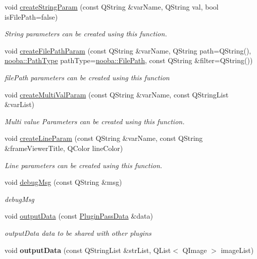 \begin{DoxyCompactItemize}
void \hyperlink{class_nooba_plugin_a_p_i_adeb3d73461908d5bc4b0e2749ec9a74e}{create\-String\-Param} (const Q\-String \&var\-Name, Q\-String val, bool is\-File\-Path=false)
\begin{DoxyCompactList}\small\item\em String parameters can be created using this function. \end{DoxyCompactList}\item 
void \hyperlink{class_nooba_plugin_a_p_i_af2517b4c6e3c48d38cf9dd7667a03186}{create\-File\-Path\-Param} (const Q\-String \&var\-Name, Q\-String path=Q\-String(), \hyperlink{namespacenooba_a63ed48aaaaeaf49835daddab6c63695e}{nooba\-::\-Path\-Type} path\-Type=\hyperlink{namespacenooba_a63ed48aaaaeaf49835daddab6c63695eaf95e834f706cf854b89935b78de070bd}{nooba\-::\-File\-Path}, const Q\-String \&filter=Q\-String())
\begin{DoxyCompactList}\small\item\em file\-Path parameters can be created using this function \end{DoxyCompactList}\item 
void \hyperlink{class_nooba_plugin_a_p_i_a210a3566212cc6ca1e947a8b8bec3818}{create\-Multi\-Val\-Param} (const Q\-String \&var\-Name, const Q\-String\-List \&var\-List)
\begin{DoxyCompactList}\small\item\em Multi value Parameters can be created using this function. \end{DoxyCompactList}\item 
void \hyperlink{class_nooba_plugin_a_p_i_a144f4a7f58fb393cab86d7b90d4a4728}{create\-Line\-Param} (const Q\-String \&var\-Name, const Q\-String \&frame\-Viewer\-Title, Q\-Color line\-Color)
\begin{DoxyCompactList}\small\item\em Line parameters can be created using this function. \end{DoxyCompactList}\item 
void \hyperlink{class_nooba_plugin_a_p_i_a80cde69ffe9b2d2594f7e45783043aed}{debug\-Msg} (const Q\-String \&msg)
\begin{DoxyCompactList}\small\item\em debug\-Msg \end{DoxyCompactList}\item 
void \hyperlink{class_nooba_plugin_a_p_i_ab096cc6f24c5da19c1be9b9e9dad384c}{output\-Data} (const \hyperlink{class_plugin_pass_data}{Plugin\-Pass\-Data} \&data)
\begin{DoxyCompactList}\small\item\em output\-Data data to be shared with other plugins \end{DoxyCompactList}\item 
\hypertarget{class_nooba_plugin_a_p_i_ae962e003211a8b80fec3ea13faa4e57e}{void {\bfseries output\-Data} (const Q\-String\-List \&str\-List, Q\-List$<$ Q\-Image $>$ image\-List)}\label{class_nooba_plugin_a_p_i_ae962e003211a8b80fec3ea13faa4e57e}


\end{DoxyCompactItemize}
